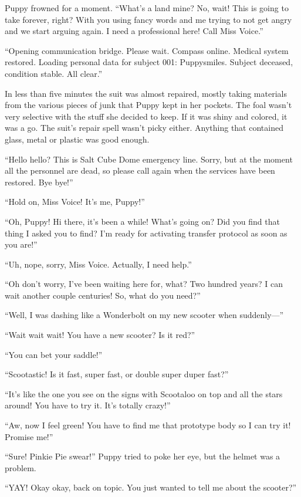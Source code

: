 Puppy frowned for a moment. ``What's a land mine? No, wait! This is going to take forever, right? With you using fancy words and me trying to not get angry and we start arguing again. I need a professional here! Call Miss Voice.''

{\mten ``Opening communication bridge. Please wait. Compass online. Medical system restored. Loading personal data for subject 001: Puppysmiles. Subject deceased, condition stable. All clear.''}

In less than five minutes the suit was almost repaired, mostly taking materials from the various pieces of junk that Puppy kept in her pockets. The foal wasn't very selective with the stuff she decided to keep. If it was shiny and colored, it was a go. The suit's repair spell  wasn't picky either. Anything that contained glass, metal or plastic was good enough.

``Hello hello? This is Salt Cube Dome emergency line. Sorry, but at the moment all the personnel are dead, so please call again when the services have been restored. Bye bye!''

``Hold on, Miss Voice! It's me, Puppy!''

``Oh, Puppy! Hi there, it's been a while! What's going on? Did you find that thing I asked you to find? I'm ready for activating transfer protocol as soon as you are!''

``Uh, nope, sorry, Miss Voice. Actually, I need help.''

``Oh don't worry, I've been waiting here for, what? Two hundred years? I can wait another couple centuries! So, what do you need?''

``Well, I was dashing like a Wonderbolt on my new scooter when suddenly---''

``Wait wait wait! You have a new scooter? Is it red?''

``You can bet your saddle!''

``Scootastic! Is it fast, super fast, or double super duper fast?''

``It's like the one you see on the signs with Scootaloo on top and all the stars around! You have to try it. It's totally crazy!''

``Aw, now I feel green! You have to find me that prototype body so I can try it! Promise me!''

``Sure! Pinkie Pie swear!'' Puppy tried to poke her eye, but the helmet was a problem.

``YAY! Okay okay, back on topic. You just wanted to tell me about the scooter?''

